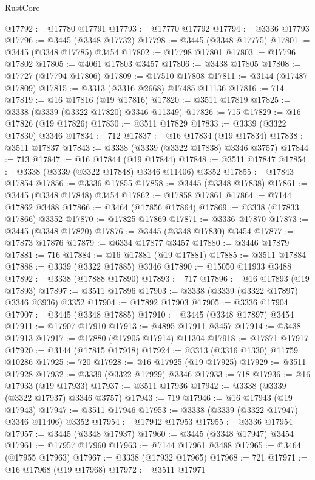 \begin{lexlean}{RustCore}
\begin{coremodule}
@17792 := @17780 @17791
@17793 := @17770 @17792
@17794 := @3336 @17793
@17796 := @3445 (@3348 @17732)
@17798 := @3445 (@3348 @17775)
@17801 := @3445 (@3348 @17785) @3454
@17802 := @17798 @17801
@17803 := @17796 @17802
@17805 := @4061 @17803 @3457
@17806 := @3438 @17805
@17808 := @17727 (@17794 @17806)
@17809 := @17510 @17808
@17811 := @3144 (@17487 @17809)
@17815 := @3313 (@3316 @2668) @17485 @11136
@17816 := 714
@17819 := @16 @17816 (@19 @17816)
@17820 := @3511 @17819
@17825 := @3338 (@3339 (@3322 @17820) @3346 @11349)
@17826 := 715
@17829 := @16 @17826 (@19 @17826)
@17830 := @3511 @17829
@17833 := @3339 (@3322 @17830) @3346
@17834 := 712
@17837 := @16 @17834 (@19 @17834)
@17838 := @3511 @17837
@17843 := @3338 (@3339 (@3322 @17838) @3346 @3757)
@17844 := 713
@17847 := @16 @17844 (@19 @17844)
@17848 := @3511 @17847
@17854 := @3338 (@3339 (@3322 @17848) @3346 @11406) @3352
@17855 := @17843 @17854
@17856 := @3336 @17855
@17858 := @3445 (@3348 @17838)
@17861 := @3445 (@3348 @17848) @3454
@17862 := @17858 @17861
@17864 := @7144 @17862 @3488
@17866 := @3464 (@17856 @17864)
@17869 := @3338 (@17833 @17866) @3352
@17870 := @17825 @17869
@17871 := @3336 @17870
@17873 := @3445 (@3348 @17820)
@17876 := @3445 (@3348 @17830) @3454
@17877 := @17873 @17876
@17879 := @6334 @17877 @3457
@17880 := @3446 @17879
@17881 := 716
@17884 := @16 @17881 (@19 @17881)
@17885 := @3511 @17884
@17888 := @3339 (@3322 @17885) @3346
@17890 := @15050 @11933 @3488
@17892 := @3338 (@17888 @17890)
@17893 := 717
@17896 := @16 @17893 (@19 @17893)
@17897 := @3511 @17896
@17903 := @3338 (@3339 (@3322 @17897) @3346 @3936) @3352
@17904 := @17892 @17903
@17905 := @3336 @17904
@17907 := @3445 (@3348 @17885)
@17910 := @3445 (@3348 @17897) @3454
@17911 := @17907 @17910
@17913 := @4895 @17911 @3457
@17914 := @3438 @17913
@17917 := @17880 (@17905 @17914) @11304
@17918 := @17871 @17917
@17920 := @3144 (@17815 @17918)
@17924 := @3313 (@3316 @1330) @11759 @10286
@17925 := 720
@17928 := @16 @17925 (@19 @17925)
@17929 := @3511 @17928
@17932 := @3339 (@3322 @17929) @3346
@17933 := 718
@17936 := @16 @17933 (@19 @17933)
@17937 := @3511 @17936
@17942 := @3338 (@3339 (@3322 @17937) @3346 @3757)
@17943 := 719
@17946 := @16 @17943 (@19 @17943)
@17947 := @3511 @17946
@17953 := @3338 (@3339 (@3322 @17947) @3346 @11406) @3352
@17954 := @17942 @17953
@17955 := @3336 @17954
@17957 := @3445 (@3348 @17937)
@17960 := @3445 (@3348 @17947) @3454
@17961 := @17957 @17960
@17963 := @7144 @17961 @3488
@17965 := @3464 (@17955 @17963)
@17967 := @3338 (@17932 @17965)
@17968 := 721
@17971 := @16 @17968 (@19 @17968)
@17972 := @3511 @17971

\end{coremodule}
\end{lexlean}
